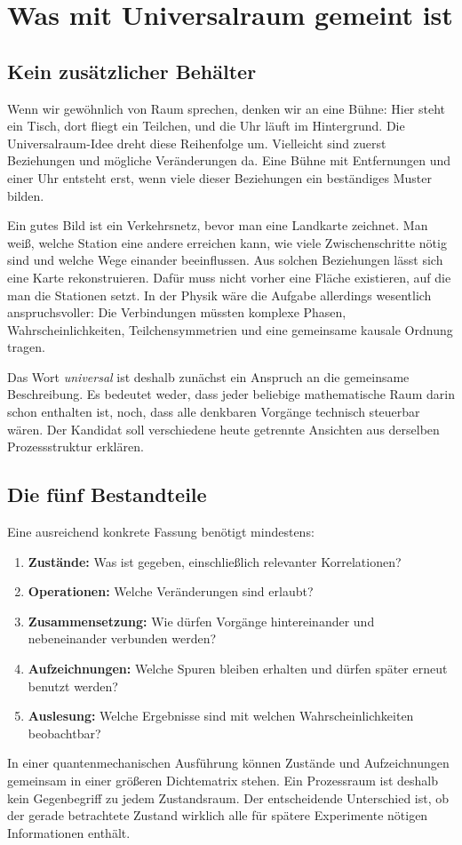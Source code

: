 \chapter{Was mit Universalraum gemeint ist}
\label{ch:idee}
\section{Kein zusätzlicher Behälter}
Wenn wir gewöhnlich von Raum sprechen, denken wir an eine Bühne: Hier steht ein Tisch, dort fliegt ein Teilchen, und die Uhr läuft im Hintergrund. Die Universalraum-Idee dreht diese Reihenfolge um. Vielleicht sind zuerst Beziehungen und mögliche Veränderungen da. Eine Bühne mit Entfernungen und einer Uhr entsteht erst, wenn viele dieser Beziehungen ein beständiges Muster bilden.

Ein gutes Bild ist ein Verkehrsnetz, bevor man eine Landkarte zeichnet. Man weiß, welche Station eine andere erreichen kann, wie viele Zwischenschritte nötig sind und welche Wege einander beeinflussen. Aus solchen Beziehungen lässt sich eine Karte rekonstruieren. Dafür muss nicht vorher eine Fläche existieren, auf die man die Stationen setzt. In der Physik wäre die Aufgabe allerdings wesentlich anspruchsvoller: Die Verbindungen müssten komplexe Phasen, Wahrscheinlichkeiten, Teilchensymmetrien und eine gemeinsame kausale Ordnung tragen.

Das Wort \emph{universal} ist deshalb zunächst ein Anspruch an die gemeinsame Beschreibung. Es bedeutet weder, dass jeder beliebige mathematische Raum darin schon enthalten ist, noch, dass alle denkbaren Vorgänge technisch steuerbar wären. Der Kandidat soll verschiedene heute getrennte Ansichten aus derselben Prozessstruktur erklären.

\section{Die fünf Bestandteile}
Eine ausreichend konkrete Fassung benötigt mindestens:
\begin{enumerate}
\item \textbf{Zustände:} Was ist gegeben, einschließlich relevanter Korrelationen?
\item \textbf{Operationen:} Welche Veränderungen sind erlaubt?
\item \textbf{Zusammensetzung:} Wie dürfen Vorgänge hintereinander und nebeneinander verbunden werden?
\item \textbf{Aufzeichnungen:} Welche Spuren bleiben erhalten und dürfen später erneut benutzt werden?
\item \textbf{Auslesung:} Welche Ergebnisse sind mit welchen Wahrscheinlichkeiten beobachtbar?
\end{enumerate}
In einer quantenmechanischen Ausführung können Zustände und Aufzeichnungen gemeinsam in einer größeren Dichtematrix stehen. Ein Prozessraum ist deshalb kein Gegenbegriff zu jedem Zustandsraum. Der entscheidende Unterschied ist, ob der gerade betrachtete Zustand wirklich alle für spätere Experimente nötigen Informationen enthält. 

